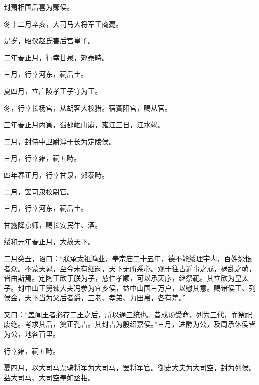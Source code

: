 \documentclass[12pt,UTF8]{ctexbook}
\begin{document}
封萧相国后喜为酂侯。



冬十二月辛亥，大司马大将军王商薨。



是岁，昭仪赵氏害后宫皇子。



二年春正月，行幸甘泉，郊泰畤。



三月，行幸河东，祠后土。



夏四月，立广陵孝王子守为王。



冬，行幸长杨宫，从胡客大校猎。宿萯阳宫，赐从官。



三年春正月丙寅，蜀郡岷山崩，雍江三日，江水竭。



二月，封侍中卫尉淳于长为定陵侯。



三月，行幸雍，祠五畤。



四年春正月，行幸甘泉，郊泰畤。



二月，罢司隶校尉官。



三月，行幸河东，祠后土。



甘露降京师，赐长安民牛、酒。



绥和元年春正月，大赦天下。



二月癸丑，诏曰：“朕承太祖鸿业，奉宗庙二十五年，德不能绥理宇内，百姓怨恨者众。不蒙天晁，至今未有继嗣，天下无所系心。观于往古近事之戒，祸乱之萌，皆由斯焉。定陶王欣于朕为子，慈仁孝顺，可以承天序，继祭祀。其立欣为皇太子。封中山王舅谏大夫冯参为宜乡侯，益中山国三万户，以慰其意。赐诸侯王、列侯金，天下当为父后者爵，三老、孝弟、力田帛，各有差。”



又曰：“盖闻王者必存二王之后，所以通三统也。昔成汤受命，列为三代，而祭祀废绝。考求其后，奠正孔吉。其封吉为殷绍嘉侯。”三月，进爵为公，及周承休侯皆为公，地各百里。



行幸雍，祠五畤。



夏四月，以大司马票骑将军为大司马，罢将军官。御史大夫为大司空，封为列侯。益大司马、大司空奉如丞相。
\end{document}
